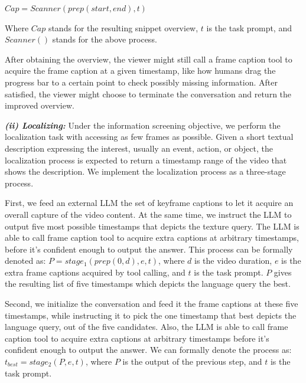 \begin{center}
$Cap = Scanner(prep(start, end), t)$
\end{center}

Where $Cap$ stands for the resulting snippet overview, $t$ is the task prompt, and $Scanner()$ stands for the above process. 

After obtaining the overview, the viewer might still call a frame caption tool to acquire the frame caption at a given timestamp, like how humans drag the progress bar to a certain point to check possibly missing information. After satisfied, the viewer might choose to terminate the conversation and return the improved overview.

\textit{\textbf{(ii) Localizing:}} Under the information screening objective, we perform the localization task with accessing as few frames as possible. Given a short textual description expressing the interest, usually an event, action, or object, the localization process is expected to return a timestamp range of the video that shows the description. We implement the localization process as a three-stage process. 

First, we feed an external LLM the set of keyframe captions to let it acquire an overall capture of the video content. At the same time, we instruct the LLM to output five most possible timestamps that depicts the texture query. The LLM is able to call frame caption tool to acquire extra captions at arbitrary timestamps, before it's confident enough to output the answer. This process can be formally denoted as: $P = stage_1(prep(0, d), e, t)$, where $d$ is the video duration, $e$ is the extra frame captions acquired by tool calling, and $t$ is the task prompt. $P$ gives the resulting list of five timestamps which depicts the language query the best.

Second, we initialize the conversation and feed it the frame captions at these five timestamps, while instructing it to pick the one timestamp that best depicts the language query, out of the five candidates. Also, the LLM is able to call frame caption tool to acquire extra captions at arbitrary timestamps before it's confident enough to output the answer. We can formally denote the process as: $t_{best} = stage_2(P, e, t)$, where $P$ is the output of the previous step, and $t$ is the task prompt.

